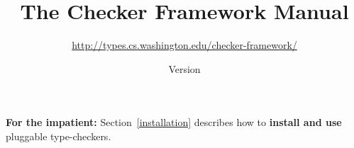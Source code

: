 \documentclass[10pt]{report}
\title{The Checker Framework Manual}
\author{%
\url{http://types.cs.washington.edu/checker-framework/}}
\date{Version \ReleaseInfo{}}
\def\codesize{\relax}           %
\newcommand{\code}[1]{\ifmmode{\mbox{\codesize\ttfamily{#1}}}\else{\codesize\ttfamily #1}\fi}
\def\<#1>{\code{#1}}
\begin{document}
\maketitle


  \let\Itemize =\itemize
  \let\Enumerate =\enumerate
  \let\Description =\description
  \def\Nospacing{\itemsep=0pt\topsep=0pt\partopsep=0pt\parskip=0pt\parsep=0pt}
  \renewenvironment{itemize}{\Itemize\Nospacing}{\endlist}
  \renewenvironment{enumerate}{\Enumerate\Nospacing}{\endlist}
  \renewenvironment{description}{\Description\Nospacing}{\endlist}

  \makeatletter
  \def\topfigrule{\kern3\p@ \hrule \kern -3.4\p@} %
  \def\botfigrule{\kern-3\p@ \hrule \kern 2.6\p@} %
  \def\dblfigrule{\kern3\p@ \hrule \kern -3.4\p@} %
  \makeatother


\newcommand{\refclass}[2]{\ahref{doc/checkers/#1/#2.html}{\<#2>}}
\newcommand{\refmethod}[4]{\ahref{doc/checkers/#1/#2.html\##3#4}{\<#2.#3>}}
\newcommand{\sunjavadoc}[2]{\ahref{http://java.sun.com/javase/6/docs/api/#1}{\<#2>}}

\setcounter{page}{2}

\noindent
\textbf{For the impatient:}
Section~\ref{installation} describes how to \textbf{install and use} pluggable
type-checkers.
\end{document}
